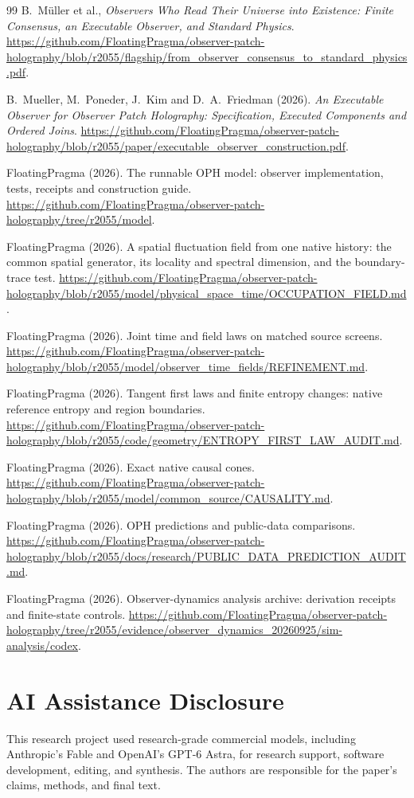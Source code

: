 \documentclass[11pt]{article}
\theoremstyle{remark}
\begin{document}
\begin{thebibliography}{99}
B.~M\"uller et al., \emph{Observers Who Read Their Universe into Existence:
Finite Consensus, an Executable Observer, and Standard Physics}.
\url{https://github.com/FloatingPragma/observer-patch-holography/blob/r2055/flagship/from_observer_consensus_to_standard_physics.pdf}.

B.~Mueller, M.~Poneder, J.~Kim and D.~A.~Friedman (2026). \emph{An Executable Observer for
Observer Patch Holography: Specification, Executed Components and Ordered Joins}.
\url{https://github.com/FloatingPragma/observer-patch-holography/blob/r2055/paper/executable_observer_construction.pdf}.

FloatingPragma (2026). The runnable OPH model: observer implementation,
tests, receipts and construction guide.
\url{https://github.com/FloatingPragma/observer-patch-holography/tree/r2055/model}.

FloatingPragma (2026). A spatial fluctuation field from one native history:
the common spatial generator, its locality and spectral dimension, and the
boundary-trace test.
\url{https://github.com/FloatingPragma/observer-patch-holography/blob/r2055/model/physical_space_time/OCCUPATION_FIELD.md}.

FloatingPragma (2026). Joint time and field laws on matched source screens.
\url{https://github.com/FloatingPragma/observer-patch-holography/blob/r2055/model/observer_time_fields/REFINEMENT.md}.

FloatingPragma (2026). Tangent first laws and finite entropy changes:
native reference entropy and region boundaries.
\url{https://github.com/FloatingPragma/observer-patch-holography/blob/r2055/code/geometry/ENTROPY_FIRST_LAW_AUDIT.md}.

FloatingPragma (2026). Exact native causal cones.
\url{https://github.com/FloatingPragma/observer-patch-holography/blob/r2055/model/common_source/CAUSALITY.md}.

FloatingPragma (2026). OPH predictions and public-data comparisons.
\url{https://github.com/FloatingPragma/observer-patch-holography/blob/r2055/docs/research/PUBLIC_DATA_PREDICTION_AUDIT.md}.

FloatingPragma (2026). Observer-dynamics analysis archive: derivation
receipts and finite-state controls.
\url{https://github.com/FloatingPragma/observer-patch-holography/tree/r2055/evidence/observer_dynamics_20260925/sim-analysis/codex}.

\end{thebibliography}

\section*{AI Assistance Disclosure}
This research project used research-grade commercial models, including
Anthropic's Fable and OpenAI's GPT-6 Astra, for research support, software
development, editing, and synthesis. The authors are responsible for the
paper's claims, methods, and final text.
\end{document}
